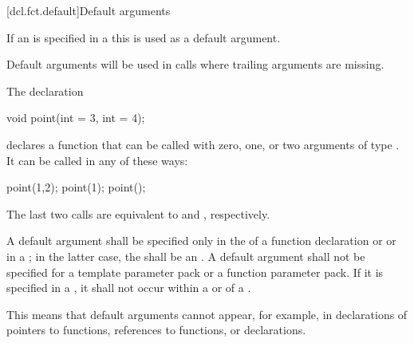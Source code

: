 [dcl.fct.default]{Default arguments}%

\pnum
If an  is specified in a
 this
is used as a default argument.
\begin{note}
Default arguments will be used in calls
where trailing arguments are missing.
\end{note}

\pnum
{}%
\begin{example}
The declaration
\begin{codeblock}
void point(int = 3, int = 4);
\end{codeblock}
declares a function that can be called with zero, one, or two arguments of type
.
It can be called in any of these ways:
\begin{codeblock}
point(1,2);  point(1);  point();
\end{codeblock}

The last two calls are equivalent to
and
,
respectively.
\end{example}

\pnum
A default argument shall be specified only in the
of a function declaration
or 
or in a
;
in the latter case, the  shall be an
.
A default argument shall not be specified for
a template parameter pack or
a function parameter pack.
If it is specified in a
,
it shall not occur within a
or
of a
.
\begin{footnote}
This means that default
arguments cannot appear,
for example, in declarations of pointers to functions,
references to functions, or
declarations.
\end{footnote}

